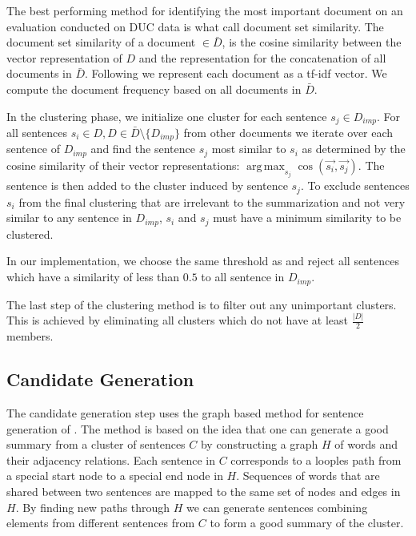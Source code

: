 \documentclass[a4paper,BCOR=10mm]{report}
\DeclareMathOperator*{\argmax}{arg\,max}
\numberwithin{lemma}{chapter}
\numberwithin{definition}{chapter}
\begin{document}
The best performing method for identifying the most important document on an evaluation conducted on DUC data is what \citeauthor{banerjee} call document set similarity.
The document set similarity of a document $ \in \bar{D}$, is the cosine similarity between the vector representation of $D$ and the representation for the concatenation of all documents in $\bar{D}$.
Following \citeauthor{banerjee} we represent each document as a tf-idf vector. We compute the document frequency based on all documents in $\bar{D}$.

In the clustering phase, we initialize one cluster for each sentence $s_j \in D_{imp}$. For all sentences $s_i \in D, D \in \bar{D} \setminus \{D_{imp}\}$ from other documents we iterate over each sentence of $D_{imp}$ and find the sentence $s_j$ most similar to $s_i$ as determined by the cosine similarity of their vector representations: $\argmax_{s_j} \cos(\vec{s_i}, \vec{s_j})$. The sentence is then added to the cluster induced by sentence $s_j$. To exclude sentences $s_i$ from the final clustering that are irrelevant to the summarization and not very similar to any sentence in $D_{imp}$, $s_i$ and $s_j$ must have a minimum similarity to be clustered.

In our implementation, we choose the same threshold as \citeauthor{banerjee} and reject all sentences which have a similarity of less than $0.5$ to all sentence in $D_{imp}$.

The last step of the clustering method is to filter out any unimportant clusters. This is achieved by eliminating all clusters which do not have at least $\frac{|D|}{2}$ members.


\subsection{Candidate Generation} \label{sec:baseline-generation}

The candidate generation step uses the graph based method for sentence generation of \citet{filippova}. The method is based on the idea that one can generate a good summary from a cluster of sentences $C$ by constructing a graph $H$ of words and their adjacency relations. Each sentence in $C$ corresponds to a looples path from a special start node to a special end node in $H$. Sequences of words that are shared between two sentences are mapped to the same set of nodes and edges in $H$. By finding new paths through $H$ we can generate sentences combining elements from different sentences from $C$ to form a good summary of the cluster.
\end{document}
